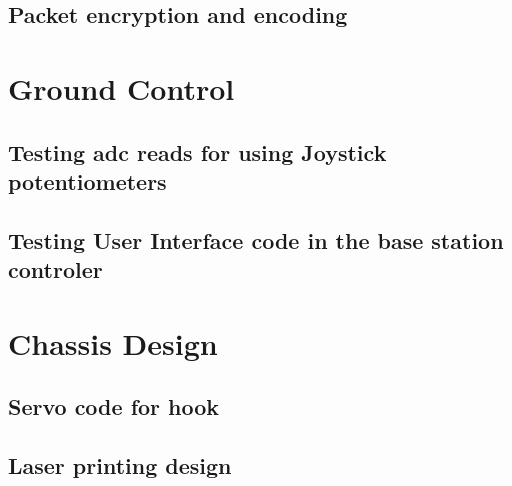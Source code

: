 \documentclass[a4paper,11pt]{article}
\begin{document}
\subsection{Packet encryption and encoding}

\section{Ground Control}
\subsection{Testing adc reads for using Joystick potentiometers}

\subsection{Testing User Interface code in the base station controler}

\section{Chassis Design}
	\subsection{Servo code for hook}
	 
	\subsection{Laser printing design}
	
	
\end{document}
